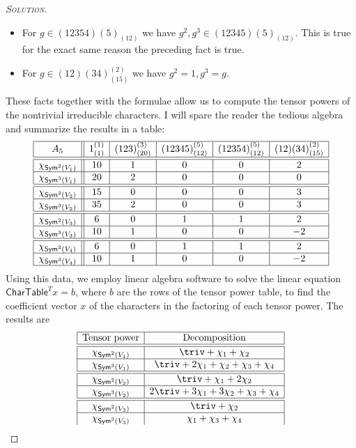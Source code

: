 \begin{proof}[{\scshape Solution}]
\begin{itemize}
   \item For $g \in (12354){(5)}_{(12)}$ we have $g^2, g^3 \in (12345){(5)}_{(12)}$. This is true for the exact same reason the preceding fact is true.
   \item For $g \in (12)(34)_{(15)}^{(2)}$ we have $g^2 = 1, g^3 = g$.
\end{itemize}
These facts together with the formulae allow us to compute the tensor powers of the nontrivial irreducible characters. I will spare the reader the tedious algebra and summarize the results in a table:
\[
\begin{array}{|c||c|c|c|c|c|}
\hline A_{5} & 1_{(1)}^{(1)} & (123)_{(20)}^{(3)} & (12345)_{(12)}^{(5)} & (12354)_{(12)}^{(5)} & (12)(34)_{(15)}^{(2)} \\
\hline
\hline \chi_{\mathsf{Sym}^2(V_1)} & 10 & 1 & 0 & 0 & 2 \\
\hline \chi_{\mathsf{Sym}^3(V_1)} & 20 & 2 & 0 & 0 & 0 \\
\hline
\hline \chi_{\mathsf{Sym}^2(V_2)} & 15 & 0 & 0 & 0 & 3 \\
\hline \chi_{\mathsf{Sym}^3(V_2)} & 35 & 2 & 0 & 0 & 3 \\
\hline
\hline \chi_{\mathsf{Sym}^2(V_3)} & 6 & 0 & 1 & 1 & 2 \\
\hline \chi_{\mathsf{Sym}^3(V_3)} & 10 & 1 & 0 & 0 & -2 \\
\hline
\hline \chi_{\mathsf{Sym}^2(V_4)} & 6 & 0 & 1 & 1 & 2 \\
\hline \chi_{\mathsf{Sym}^3(V_4)} & 10 & 1 & 0 & 0 & -2 \\
\hline
\end{array}
\]
Using this data, we employ linear algebra software to solve the linear equation $\mathsf{CharTable}^Tx = b$, where $b$ are the rows of the tensor power table, to find the coefficient vector $x$ of the characters in the factoring of each tensor power. The results are
\[
\begin{array}{|c|c|}
\hline \text{Tensor power} & \text{Decomposition} \\
\hline
\hline \chi_{\Sym^2(V_1)}  &  \triv + \chi_1 + \chi_2\\
\hline \chi_{\Sym^3(V_1)}  &  \triv + 2\chi_1 + \chi_2 + \chi_3 + \chi_4 \\
\hline
\hline \chi_{\Sym^2(V_2)} & \triv + \chi_1 + 2 \chi_2 \\
\hline \chi_{\Sym^3(V_2)} & 2\triv + 3\chi_1 + 3\chi_2 + \chi_3 + \chi_4 \\
\hline
\hline \chi_{\Sym^2(V_3)}  & \triv + \chi_2 \\
\hline \chi_{\Sym^3(V_3)}  & \chi_1 + \chi_3 + \chi_4 \\

\end{array}\]
\end{proof}

